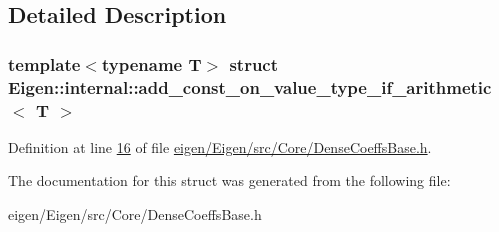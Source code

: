 \subsection{Detailed Description}
\subsubsection*{template$<$typename T$>$\newline
struct Eigen\+::internal\+::add\+\_\+const\+\_\+on\+\_\+value\+\_\+type\+\_\+if\+\_\+arithmetic$<$ T $>$}



Definition at line \hyperlink{eigen_2_eigen_2src_2_core_2_dense_coeffs_base_8h_source_l00016}{16} of file \hyperlink{eigen_2_eigen_2src_2_core_2_dense_coeffs_base_8h_source}{eigen/\+Eigen/src/\+Core/\+Dense\+Coeffs\+Base.\+h}.



The documentation for this struct was generated from the following file\+:\begin{DoxyCompactItemize}
\item 
eigen/\+Eigen/src/\+Core/\+Dense\+Coeffs\+Base.\+h\end{DoxyCompactItemize}
